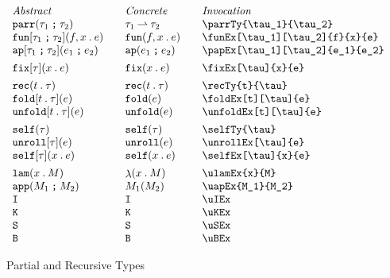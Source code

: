 \documentclass[11pt]{article}
\begin{document}
\begin{figure}

  \begin{small}
    \begin{displaymath}
      \begin{array}{l@{\qquad}l@{\qquad}l@{\qquad}l}
        \textit{Abstract} & \textit{Concrete} & \textit{Invocation} \\
        \parrTy{\tau_1}{\tau_2}         & \parrTy*{\tau_1}{\tau_2} & \verb|\parrTy{\tau_1}{\tau_2}|          \\
        \funEx[\tau_1][\tau_2]{f}{x}{e} & \funEx*{f}{x}{e}         & \verb|\funEx[\tau_1][\tau_2]{f}{x}{e}|  \\
        \papEx{e_1}{e_2}                & \papEx*{e_1}{e_2}        & \verb|\papEx[\tau_1][\tau_2]{e_1}{e_2}| \\[1ex]

        \fixEx[\tau]{x}{e}              & \fixEx*[\tau]{x}{e}      & \verb|\fixEx[\tau]{x}{e}|               \\[1ex]

        \recTy{t}{\tau}                 & \recTy*{t}{\tau}         & \verb|\recTy{t}{\tau}|                  \\
        \foldEx[t][\tau]{e}             & \foldEx*{e}              & \verb|\foldEx[t][\tau]{e}|              \\
        \unfoldEx[t][\tau]{e}           & \unfoldEx*{e}            & \verb|\unfoldEx[t][\tau]{e}|            \\[1ex]

        \selfTy{\tau}                   & \selfTy*{\tau}           & \verb|\selfTy{\tau}|                    \\
        \unrollEx[\tau]{e}              & \unrollEx*{e}            & \verb|\unrollEx[\tau]{e}|               \\
        \selfEx[\tau]{x}{e}             & \selfEx*{x}{e}           & \verb|\selfEx[\tau]{x}{e}|              \\[1ex]

        \ulamEx{x}{M}                   & \ulamEx*{x}{M}           & \verb|\ulamEx{x}{M}|                    \\
        \uapEx{M_1}{M_2}                & \uapEx*{M_1}{M_2}        & \verb|\uapEx{M_1}{M_2}|                 \\
        \uIEx                           & \uIEx*                   & \verb|\uIEx|                            \\
        \uKEx                           & \uKEx*                   & \verb|\uKEx|                            \\
        \uSEx                           & \uSEx*                   & \verb|\uSEx|                            \\
        \uBEx                           & \uBEx*                   & \verb|\uBEx|
      \end{array}
    \end{displaymath}
  \end{small}

  \caption{Partial and Recursive Types}
  \label{fig:recursive}
\end{figure}
\end{document}
